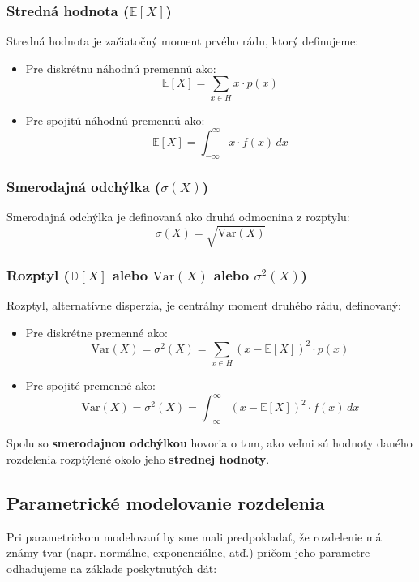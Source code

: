 \subsubsection{Stredná hodnota ($\mathbb{E}[X]$)}

Stredná hodnota je začiatočný moment prvého rádu, ktorý definujeme:

\begin{itemize}
  \item Pre diskrétnu náhodnú premennú ako:
  \[
  \mathbb{E}[X] = \sum_{x \in H} x \cdot p(x)
  \]
  \item Pre spojitú náhodnú premennú ako:
  \[
  \mathbb{E}[X] = \int_{-\infty}^{\infty} x \cdot f(x) \, dx
  \]
\end{itemize}

\subsubsection{Smerodajná odchýlka ($\sigma(X)$)}

Smerodajná odchýlka je definovaná ako druhá odmocnina z rozptylu:
\[
\sigma(X) = \sqrt{\mathrm{Var}(X)}
\]

\subsubsection{Rozptyl ($\mathbb{D}[X]$ alebo $\mathrm{Var}(X)$ alebo $\sigma^2(X)$)}

Rozptyl, alternatívne disperzia, je centrálny moment druhého rádu, definovaný:

\begin{itemize}
  \item Pre diskrétne premenné ako:
  \[
  \mathrm{Var}(X) = \sigma^2(X) = \sum_{x \in H} (x - \mathbb{E}[X])^2 \cdot p(x)
  \]
  \item Pre spojité premenné ako:
  \[
  \mathrm{Var}(X) = \sigma^2(X) = \int_{-\infty}^{\infty} (x - \mathbb{E}[X])^2 \cdot f(x) \, dx
  \]
\end{itemize}

Spolu so \textbf{smerodajnou odchýlkou} hovoria o tom, ako veľmi sú hodnoty daného rozdelenia rozptýlené okolo jeho \textbf{strednej hodnoty}.

\subsection{Parametrické modelovanie rozdelenia}

Pri parametrickom modelovaní by sme mali predpokladať, že rozdelenie má známy tvar (napr. normálne, exponenciálne, atď.) pričom jeho parametre odhadujeme na základe poskytnutých dát:

